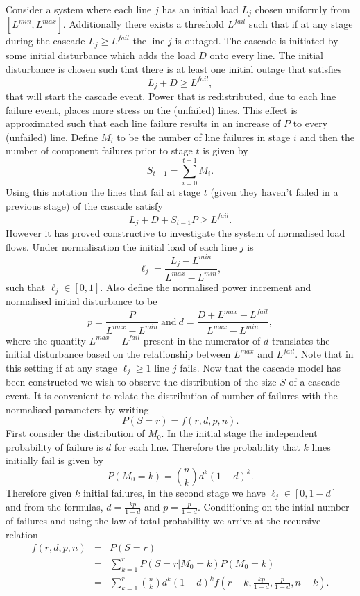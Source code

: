 \documentclass{article}
\begin{document}
Consider a system where each line $j$ has an initial load $L_j$ chosen uniformly from $[L^{min}, L^{max}]$. Additionally there exists a threshold $L^{fail}$ such that if at any stage during the cascade $L_j\ge L^{fail}$ the line $j$ is outaged. The cascade is initiated by some initial disturbance which adds the load $D$ onto every line. The initial disturbance is chosen such that there is at least one initial outage that satisfies
\[ L_j + D \ge L^{fail},\]
that will start the cascade event. Power that is redistributed, due to each line failure event, places more stress on the (unfailed) lines. This effect is approximated such that each line failure results in an increase of $P$ to every (unfailed) line. Define $M_i$ to be the number of line failures in stage $i$ and then the number of component failures prior to stage $t$ is given by
\[S_{t-1} = \sum_{i=0}^{t-1} M_i.\]
Using this notation the lines that fail at stage $t$ (given they haven't failed in a previous stage) of the cascade satisfy
\[ L_j+D+S_{t-1}P \ge L^{fail}.\]
However it has proved constructive to investigate the system of normalised load flows. Under normalisation the initial load of each line $j$ is 
\[\ell_j = \frac{L_j-L^{min}}{L^{max}-L^{min}},\]
such that $\ell_j \in [0,1]$. Also define the normalised power increment and normalised initial disturbance to be
\[p = \frac{P}{L^{max}-L^{min}} \ \text{and} \  d = \frac{D+L^{max}-L^{fail}}{L^{max}-L^{min}},\]
where the quantity $L^{max}-L^{fail}$ present in the numerator of $d$ translates the initial disturbance based on the relationship between $L^{max}$ and $L^{fail}$. Note that in this setting if at any stage $\ell_j \ge 1$ line $j$ fails. Now that the cascade model has been constructed we wish to observe the distribution of the size $S$ of a cascade event. It is convenient to relate the distribution of number of failures with the normalised parameters by writing
\[P(S=r) = f(r,d,p,n).\]
 First consider the distribution of $M_0$. In the initial stage the independent probability of failure is $d$ for each line. Therefore the probability that $k$ lines initially fail is given by
\[P(M_0=k) = {n\choose k} d^k(1-d)^k.\]
Therefore given $k$ initial failures, in the second stage we have $\ell_j\in [0,1-d]$ and from the formulas, $d = \frac{kp}{1-d}$ and $p = \frac{p}{1-d}$. Conditioning on the intial number of failures and using the law of total probability we arrive at the recursive relation 
\begin{eqnarray*}
f(r,d,p,n) &=& P(S=r)\\
&=& \sum_{k=1}^{r} P(S=r|M_0 = k)P(M_0=k)\\
&=&\sum_{k=1}^{r} {n\choose k} d^k(1-d)^k f(r-k,\frac{kp}{1-d},\frac{p}{1-d}, n-k).
\end{eqnarray*}
\end{document}
